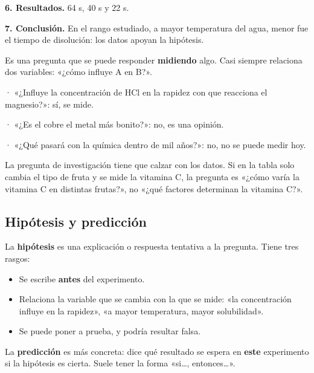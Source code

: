  

\textbf{6. Resultados.} 64 s, 40 s y 22 s.

 

\textbf{7. Conclusión.} En el rango estudiado, a mayor temperatura del agua, menor fue el tiempo de disolución: los datos apoyan la hipótesis.

  
\begin{clave} Es una pregunta que se puede responder \textbf{midiendo} algo. Casi siempre relaciona dos variables: «¿cómo influye A en B?».\end{clave}
 
\begin{clave}[{¿Investigable o no?}] · «¿Influye la concentración de HCl en la rapidez con que reacciona el magnesio?»: sí, se mide.\par · «¿Es el cobre el metal más bonito?»: no, es una opinión.\par · «¿Qué pasará con la química dentro de mil años?»: no, no se puede medir hoy.\end{clave}
 
\begin{ojo}[{Ojo}] La pregunta de investigación tiene que calzar con los datos. Si en la tabla solo cambia el tipo de fruta y se mide la vitamina C, la pregunta es «¿cómo varía la vitamina C en distintas frutas?», no «¿qué factores determinan la vitamina C?».\end{ojo}
\subsection{Hipótesis y predicción}
La \textbf{hipótesis} es una explicación o respuesta tentativa a la pregunta. Tiene tres rasgos:

 
\begin{itemize}
  \item Se escribe \textbf{antes} del experimento.
  \item Relaciona la variable que se cambia con la que se mide: «la concentración influye en la rapidez», «a mayor temperatura, mayor solubilidad».
  \item Se puede poner a prueba, y podría resultar falsa.
\end{itemize}
 

La \textbf{predicción} es más concreta: dice qué resultado se espera en \textbf{este} experimento si la hipótesis es cierta. Suele tener la forma «si\dots{}, entonces\dots{}».

